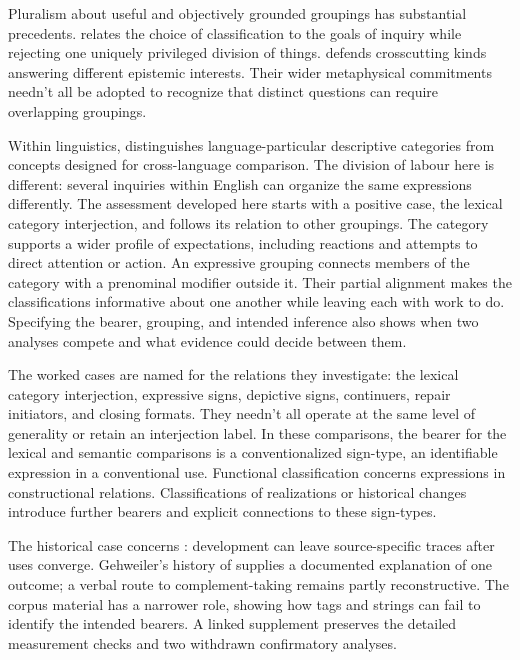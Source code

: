 \documentclass[12pt]{article}
\begin{document}
Pluralism about useful and objectively grounded groupings has substantial
precedents. \textcite[5--7, 17--18]{dupre1993disorder} relates the choice of
classification to the goals of inquiry while rejecting one uniquely
privileged division of things. \textcite[63--64, 69--72]{khalidi2013}
defends crosscutting kinds answering different epistemic interests.
Their wider metaphysical commitments needn't all be adopted to recognize
that distinct questions can require overlapping groupings.

Within linguistics, \textcite[663, 666, 680]{haspelmath2010} distinguishes
language-particular descriptive categories from concepts designed for
cross-language comparison. The division of labour here is different:
several inquiries within English can organize the same expressions
differently. The assessment developed here starts with a positive case,
the lexical category interjection, and follows its relation to other
groupings. The category supports a wider profile of expectations, including
reactions and attempts to direct attention or action. An expressive grouping
connects members of the category with a prenominal modifier outside it. Their partial alignment makes the classifications informative
about one another while leaving each with work to do. Specifying the bearer, grouping, and intended inference also
shows when two analyses compete and what evidence could decide between them.

The worked cases are named for the relations they investigate: the
lexical category interjection, expressive signs, depictive signs, continuers, repair
initiators, and closing formats. They needn't all operate at the same level
of generality or retain an interjection label. In these comparisons, the
bearer for the lexical and semantic comparisons is a conventionalized
sign-type, an identifiable expression in a conventional use. Functional
classification concerns expressions in constructional relations. Classifications
of realizations or historical changes introduce further bearers and
explicit connections to these sign-types.

The historical case concerns : development can leave
source-specific traces after uses converge. Gehweiler's history of
 supplies a documented explanation of one outcome; a verbal
route to complement-taking  remains partly reconstructive.
The corpus material has a narrower role, showing how tags and strings
can fail to identify the intended bearers. A linked supplement preserves
the detailed measurement checks and two withdrawn confirmatory analyses.
\end{document}
